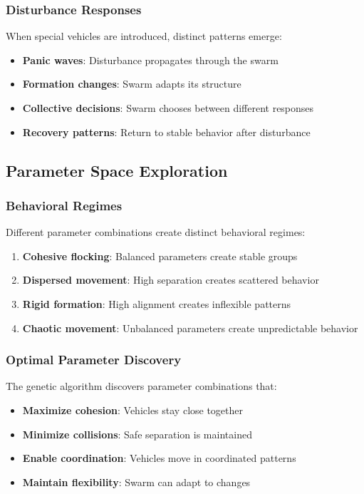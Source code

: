 \documentclass[12pt,a4paper]{article}
\begin{document}
\subsubsection{Disturbance Responses}
When special vehicles are introduced, distinct patterns emerge:

\begin{itemize}
    \item \textbf{Panic waves}: Disturbance propagates through the swarm
    \item \textbf{Formation changes}: Swarm adapts its structure
    \item \textbf{Collective decisions}: Swarm chooses between different responses
    \item \textbf{Recovery patterns}: Return to stable behavior after disturbance
\end{itemize}

\subsection{Parameter Space Exploration}

\subsubsection{Behavioral Regimes}
Different parameter combinations create distinct behavioral regimes:

\begin{enumerate}
    \item \textbf{Cohesive flocking}: Balanced parameters create stable groups
    \item \textbf{Dispersed movement}: High separation creates scattered behavior
    \item \textbf{Rigid formation}: High alignment creates inflexible patterns
    \item \textbf{Chaotic movement}: Unbalanced parameters create unpredictable behavior
\end{enumerate}

\subsubsection{Optimal Parameter Discovery}
The genetic algorithm discovers parameter combinations that:

\begin{itemize}
    \item \textbf{Maximize cohesion}: Vehicles stay close together
    \item \textbf{Minimize collisions}: Safe separation is maintained
    \item \textbf{Enable coordination}: Vehicles move in coordinated patterns
    \item \textbf{Maintain flexibility}: Swarm can adapt to changes
\end{itemize}
\end{document}
